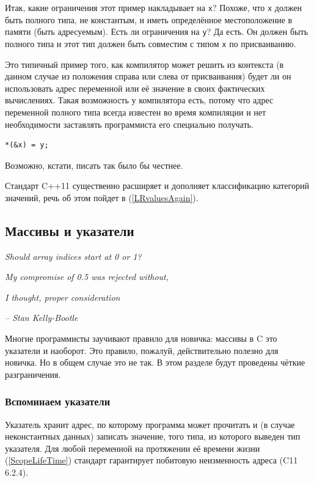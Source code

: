\documentclass[a4paper,12pt,oneside]{article}
\begin{document}
Итак, какие ограничения этот пример накладывает на \lstinline!x!? Похоже, что \lstinline!x! должен быть полного типа, не константым, и иметь определённое местоположение в памяти (быть адресуемым). Есть ли ограничения на \lstinline!y!? Да есть. Он должен быть полного типа и этот тип должен быть совместим с типом \lstinline!x! по присваиванию.  

Это типичный пример того, как компилятор может решить из контекста (в данном случае из положения справа или слева от присваивания) будет ли он использовать адрес переменной или её значение в своих фактических вычислениях. Такая возможность у компилятора есть, потому что адрес переменной полного типа всегда известен во время компиляции и нет необходимости заставлять программиста его специально получать.

\begin{lstlisting}
*(&x) = y;
\end{lstlisting}

Возможно, кстати, писать так было бы честнее.

Стандарт C++11 существенно расширяет и дополняет классификацию категорий значений, речь об этом пойдет в (\ref{LRvaluesAgain}).

\pagebreak
\subsection{Массивы и указатели}\label{ArrPointers}

\hfill\textit{Should array indices start at 0 or 1?}

\hfill\textit{My compromise of 0.5 was rejected without,} 

\hfill\textit{I thought, proper consideration}{\vspace{0.5em}}

\hfill\textit{-- Stan Kelly-Bootle}

Многие программисты заучивают правило для новичка: массивы в C это указатели и наоборот. Это правило, пожалуй, действительно полезно для новичка. Но в общем случае это не так. В этом разделе будут проведены чёткие разграничения. 

\subsubsection{Вспоминаем указатели}

Указатель хранит адрес, по которому программа может прочитать и (в случае неконстантных данных) записать значение, того типа, из которого выведен тип указателя. Для любой переменной на протяжении её времени жизни (\ref{ScopeLifeTime}) стандарт гарантирует побитовую неизменность адреса (C11 6.2.4).
\end{document}
